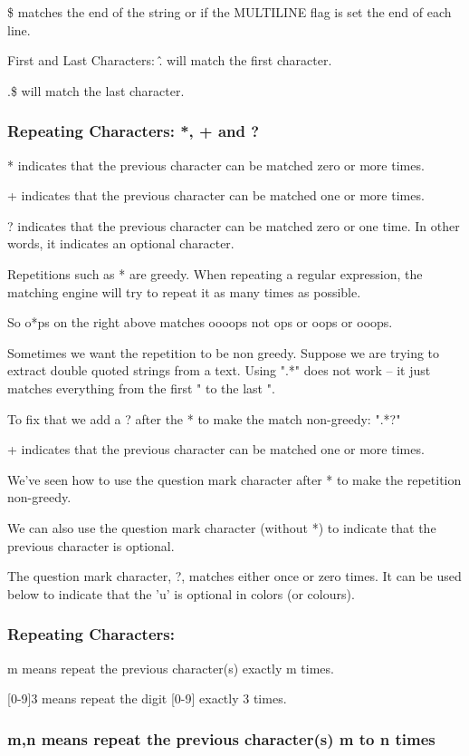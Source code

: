 \documentclass{article}
\begin{document}
\$ matches the end of the string or if the MULTILINE flag is set the end of each line.

First and Last Characters:
\^. will match the first character.

.\$ will match the last character.

\subsubsection{Repeating Characters: *, + and ?}
* indicates that the previous character can be matched zero or more times.

+ indicates that the previous character can be matched one or more times.

? indicates that the previous character can be matched zero or one time.  In other words, it indicates an optional character.

Repetitions such as * are greedy.  When repeating a regular expression, the matching engine will try to repeat it as many times as possible.

So o*ps on  the right above matches oooops not ops or oops or ooops.

Sometimes we want the repetition to be non greedy.  Suppose we are trying to extract double quoted strings from a text.  Using ".*" does not work – it just matches everything from the first " to the last ".

To fix that we add a ? after  the * to make the match non-greedy: ".*?"

+ indicates that the previous character can be matched one or more times.

We’ve  seen how to use the question mark character after * to make the repetition non-greedy.

We can also use the question mark character (without *) to indicate  that the previous character is optional. 

The question mark character, ?, matches either once or zero times.  It can be used below to indicate that the 'u' is optional in colors (or colours).

\subsubsection{Repeating Characters: {}}
{m} means repeat the previous character(s) exactly m times.

[0-9]{3} means repeat the digit [0-9] exactly 3 times.

\subsubsection{{m,n} means repeat the previous character(s) m to n times}
\end{document}
